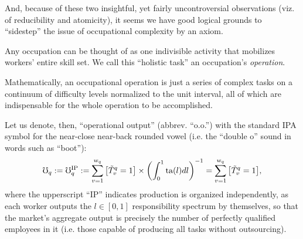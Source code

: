 \documentclass[hidelinks, nonatbib]{elsarticle}
\begin{document}
And, because of these two insightful, yet fairly uncontroversial observations (viz. of reducibility and atomicity), it seems we have good logical grounds to ``sidestep'' the issue of occupational complexity by an axiom.
\begin{axiom}
    \label{oca}
    Any occupation can be thought of as one indivisible activity that mobilizes workers' entire skill set. We call this ``holistic task'' an occupation's \textit{operation}.

    Mathematically, an occupational operation is just a series of complex tasks on a continuum of difficulty levels normalized to the unit interval, all of which are indispensable for the whole operation to be accomplished.
    
    \begin{subaxiom}
        Let us denote, then, ``operational output'' (abbrev. ``o.o.'') with the standard IPA \parencite[][]{ipa} symbol for the near-close near-back rounded vowel (i.e. the ``double o'' sound in words such as ``boot''):
        \begin{gather}
            \mho_q
            :=
            \mho_{q}^{\text{IP}}
            :=
            \sum_{v=1}^{w_q}{
                \left[
                    \tilde{T}_{v}^{q}
                    =
                    1
                \right]
                \times
                \left(
                    \int_{0}^{1}{
                        \text{ta}(l)
                        dl
                    }
                \right) ^ {-1}
            }
            =
            \sum_{v=1}^{w_q}{
                \left[
                    \tilde{T}_{v}^{q}
                    =
                    1
                \right]
            }
            ,
        \end{gather}
        where the upperscript ``IP'' indicates production is organized independently, as each worker outputs the $l \in [0,1]$ responsibility spectrum by themselves, so that the market's aggregate output is precisely the number of perfectly qualified employees in it (i.e. those capable of producing all tasks without outsourcing).
        

\end{subaxiom}
\end{axiom}
\end{document}
